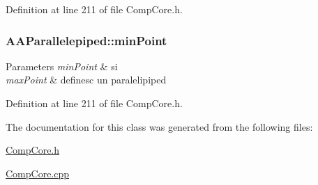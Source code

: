 Definition at line 211 of file Comp\-Core.\-h.

\hypertarget{class_a_a_parallelepiped_af680a306612b1cface1885029415dd59}{
\subsubsection[{min\-Point}]{ A\-A\-Parallelepiped\-::min\-Point}}\label{class_a_a_parallelepiped_af680a306612b1cface1885029415dd59}

\begin{DoxyParams}{Parameters}
{\em min\-Point} & si \\
\hline
{\em max\-Point} & definesc un paralelipiped \\
\hline
\end{DoxyParams}


Definition at line 211 of file Comp\-Core.\-h.



The documentation for this class was generated from the following files\-:\begin{DoxyCompactItemize}
\item 
\hyperlink{_comp_core_8h}{Comp\-Core.\-h}\item 
\hyperlink{_comp_core_8cpp}{Comp\-Core.\-cpp}\end{DoxyCompactItemize}
